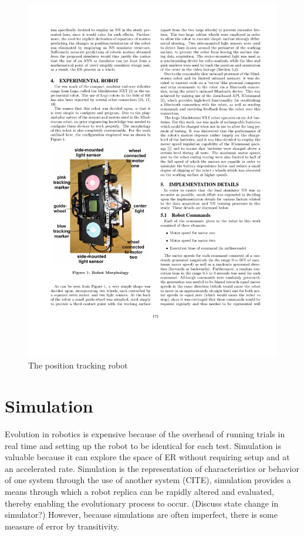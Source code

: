 \documentclass{sig-alternate}
\begin{document}
\begin{figure}%
  \includegraphics[scale=1]{cr1}
\caption{The position tracking robot}
\label{fig:pRobot}
\end{figure}
	
\section{Simulation}\label{simulation}
Evolution in robotics is expensive because of the overhead of running trials in real time and setting up the robot to be identical for each test. Simulation is valuable because it can explore the space of ER without requiring setup and at an accelerated rate. Simulation is the representation of characteristics or behavior of one system through the use of another system (CITE), simulation provides a means through which a robot replica can be rapidly altered and evaluated, thereby enabling the evolutionary process to occur. (Discuss state change in simulator?)  However, because simulations are often imperfect, there is some measure of error by transitivity.
\end{document}
